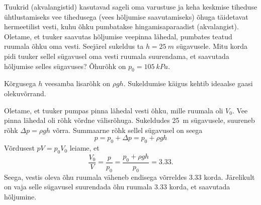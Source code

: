 
Tuukrid (akvalangistid) kasutavad sageli oma varustuse ja keha keskmise tiheduse ühtlustamiseks vee tihedusega (vees hõljumise saavutamiseks) õhuga täidetavat hermeetilist vesti, kuhu õhku pumbatakse hingamisaparaadist (akvalangist). Oletame, et tuuker saavutas hõljumise veepinna lähedal, pumbates teatud ruumala õhku oma vesti. Seejärel sukeldus ta $h = \SI{25}{m}$ sügavusele. Mitu korda pidi tuuker sellel sügavusel oma vesti ruumala suurendama, et saavutada hõljumise selles sügavuses? Õhurõhk on $p_0 = \SI{105}{kPa}$.

\hint
Kõrgusega $h$ veesamba lisarõhk on $\rho gh$. Sukeldumise käigus kehtib ideaalse gaasi olekuvõrrand.

\solu
Oletame, et tuuker pumpas pinna lähedal vesti õhku, mille ruumala oli $V_0$. Vee pinna lähedal oli rõhk võrdne välisrõhuga. Sukeldudes \SI{25}{m} sügavusele, suureneb rõhk $\Delta p = \rho gh$ võrra. Summaarne rõhk sellel sügavusel on seega
\[
p=p_{0}+\Delta p=p_{0}+\rho g h
\]
Võrdusest $pV=p_0V_0$ leiame, et
\[
\frac{V_{0}}{V}=\frac{p}{p_{0}}=\frac{p_{0}+\rho g h}{p_{0}}=\num{3,33}.
\]
Seega, vestis oleva õhu ruumala väheneb endisega võrreldes \num{3,33} korda. Järelikult on vaja selle sügavusel suurendada õhu ruumala \num{3,33} korda, et saavutada hõljumine.
\probend